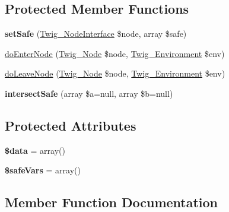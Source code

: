 \subsection*{Protected Member Functions}
\begin{DoxyCompactItemize}
\item 
{\bfseries set\+Safe} (\hyperlink{interfaceTwig__NodeInterface}{Twig\+\_\+\+Node\+Interface} \$node, array \$safe)\hypertarget{classTwig__NodeVisitor__SafeAnalysis_aaf6bc4d0e744f7ef2d49dd37418ae600}{}\label{classTwig__NodeVisitor__SafeAnalysis_aaf6bc4d0e744f7ef2d49dd37418ae600}

\item 
\hyperlink{classTwig__NodeVisitor__SafeAnalysis_a3c50c3d11938da8d03782eb9cfdec2ee}{do\+Enter\+Node} (\hyperlink{classTwig__Node}{Twig\+\_\+\+Node} \$node, \hyperlink{classTwig__Environment}{Twig\+\_\+\+Environment} \$env)
\item 
\hyperlink{classTwig__NodeVisitor__SafeAnalysis_ab80700031a154a54b5156cb4b6605b31}{do\+Leave\+Node} (\hyperlink{classTwig__Node}{Twig\+\_\+\+Node} \$node, \hyperlink{classTwig__Environment}{Twig\+\_\+\+Environment} \$env)
\item 
{\bfseries intersect\+Safe} (array \$a=null, array \$b=null)\hypertarget{classTwig__NodeVisitor__SafeAnalysis_ad4f57f5c60cf4126630a063d5bc5036b}{}\label{classTwig__NodeVisitor__SafeAnalysis_ad4f57f5c60cf4126630a063d5bc5036b}

\end{DoxyCompactItemize}
\subsection*{Protected Attributes}
\begin{DoxyCompactItemize}
\item 
{\bfseries \$data} = array()\hypertarget{classTwig__NodeVisitor__SafeAnalysis_a12bb5eb4d7b316431792838834c67257}{}\label{classTwig__NodeVisitor__SafeAnalysis_a12bb5eb4d7b316431792838834c67257}

\item 
{\bfseries \$safe\+Vars} = array()\hypertarget{classTwig__NodeVisitor__SafeAnalysis_a0f3f0233f33d38e3f1c6ecc4db132b9a}{}\label{classTwig__NodeVisitor__SafeAnalysis_a0f3f0233f33d38e3f1c6ecc4db132b9a}

\end{DoxyCompactItemize}


\subsection{Member Function Documentation}
